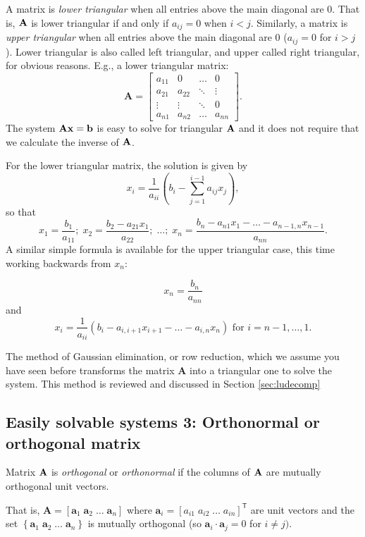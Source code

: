 A matrix is {\em lower triangular} when all entries above the main diagonal are 0.  That is, $\bf A$ is lower triangular if and only if $a_{ij} = 0$ when $i < j$.  Similarly, a matrix is {\em upper triangular} when all entries above the main diagonal are 0 ($a_{ij} = 0 $ for $i > j$).  Lower triangular is also called left triangular, and upper called right triangular, for obvious reasons.  
E.g., a lower triangular matrix:
\[
\mathbf{A}=\left[
\begin{array}{llll}
a_{11} &       0       &     \ldots        &                0\\
a_{21} & a_{22} &        \ddots        &       \vdots        \\
\vdots  &  \vdots  & \ddots &     0         \\
a_{n1} & a_{n2}  & \ldots   & a_{nn}
\end{array}
\right].
\]
The system $\mathbf{Ax} = \bf b$ is easy to solve for triangular $\bf A$ and it does not require that we calculate the inverse of $\bf A$.

 For the lower triangular matrix, the solution is given by 
\[ x_i=\frac{1}{a_{ii}}\left(b_i-\sum\limits_{j=1}^{i-1}a_{ij}x_j\right),\] so that 
\[
x_1 = \frac{b_1}{a_{11}}; \; x_2 = \frac{b_2 - a_{21}x_1}{a_{22}}; \; \ldots;\; x_n=\frac{b_n-a_{n1}x_1-\ldots-a_{n-1,n}x_{n-1}}{a_{nn}}.
\]
A similar simple  formula is available for the upper triangular case, this time working backwards from $x_n$:

\[ x_n = \frac {b_n}{a_{nn}}\] and \[ x_i  =  \frac{1}{a_{ii}} \left(b_i-a_{i,i+1}x_{i+1}-\ldots-a_{i,n}x_n\right) \mbox{ for } i=n-1,\ldots,1.\]

The method of Gaussian elimination, or row reduction, which we assume you have seen before transforms the matrix $\mathbf A$  into a triangular one to solve the system.    This method is reviewed and discussed in Section \ref{sec:ludecomp}

\subsection{Easily solvable systems 3: Orthonormal or orthogonal matrix}

Matrix $\bf A$ is {\em orthogonal} or {\em orthonormal} if the columns of $\bf A$ are mutually orthogonal unit vectors. 

That is, $ \mathbf{A}=\left[ \mathbf{a}_1 \; \mathbf{a}_2 \; \ldots \;\mathbf{a}_n \right] $ where 
$\mathbf{a}_i =\left[ a_{i1}\; a_{i2} \; \ldots\; a_{in}\right]^\mathsf{T}$ are unit vectors and the set $\left\{ \mathbf{a}_1 \; \mathbf{a}_2 \; \ldots \;\mathbf{a}_n \right\}$ is mutually orthogonal (so $ \mathbf{a}_i \cdot  \mathbf{a}_j = 0$ for $i \ne j)$.

